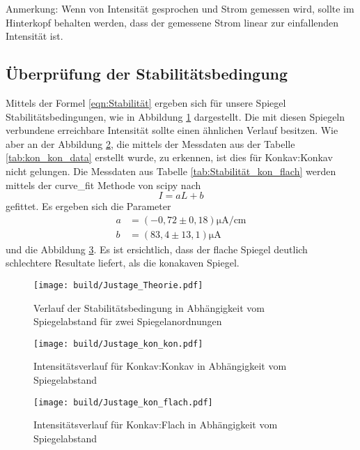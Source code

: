 Anmerkung: Wenn von Intensität gesprochen und Strom gemessen wird, sollte im Hinterkopf behalten werden, dass der gemessene Strom linear zur einfallenden Intensität ist.

\subsection{Überprüfung der Stabilitätsbedingung}
Mittels der Formel \eqref{eqn:Stabilität} ergeben sich für unsere Spiegel Stabilitätsbedingungen, wie in Abbildung \ref{fig:Stabilität_Theorie} dargestellt. 
Die mit diesen Spiegeln verbundene erreichbare Intensität sollte einen ähnlichen Verlauf besitzen.
Wie aber an der Abbildung \ref{fig:Stabilität_kon_kon}, die mittels der Messdaten aus der Tabelle
\ref{tab:kon_kon_data} erstellt wurde, zu erkennen, ist dies für Konkav:Konkav nicht gelungen.
Die Messdaten aus Tabelle \ref{tab:Stabilität_kon_flach} werden mittels der curve\_fit Methode von scipy \cite{scipy} nach
\begin{equation}
  I=aL+b
\end{equation}
gefittet. Es ergeben sich die Parameter
\begin{align}
  a&=(-0,72\pm 0,18)\si{\micro\ampere\per\centi\meter}\nonumber\\
  b&=(83,4\pm 13,1)\si{\micro\ampere}
\end{align}
und die Abbildung \ref{fig:Stabilität_kon_flach}.
Es ist ersichtlich, dass der flache Spiegel deutlich schlechtere Resultate liefert, als die konakaven Spiegel.


\begin{figure}
  \centering
  \texttt{[image: build/Justage\_Theorie.pdf]}
  \caption{Verlauf der Stabilitätsbedingung in Abhängigkeit vom Spiegelabstand für zwei Spiegelanordnungen}
  \label{fig:Stabilität_Theorie}
\end{figure}


\begin{figure}
  \centering
  \texttt{[image: build/Justage\_kon\_kon.pdf]}
  \caption{Intensitätsverlauf für Konkav:Konkav in Abhängigkeit vom Spiegelabstand}
  \label{fig:Stabilität_kon_kon}
\end{figure}

\begin{figure}
  \centering
  \texttt{[image: build/Justage\_kon\_flach.pdf]}
  \caption{Intensitätsverlauf für Konkav:Flach in Abhängigkeit vom Spiegelabstand}
  \label{fig:Stabilität_kon_flach}
\end{figure}

